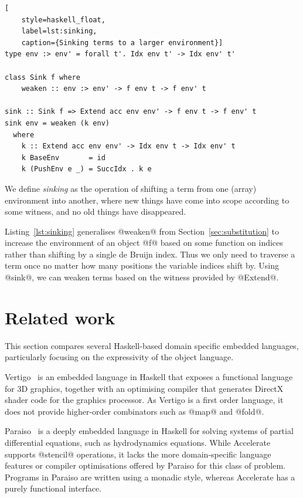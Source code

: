 \begin{lstlisting}[
    style=haskell_float,
    label=lst:sinking,
    caption={Sinking terms to a larger environment}]
type env :> env' = forall t'. Idx env t' -> Idx env' t'

class Sink f where
    weaken :: env :> env' -> f env t -> f env' t

sink :: Sink f => Extend acc env env' -> f env t -> f env' t
sink env = weaken (k env)
  where
    k :: Extend acc env env' -> Idx env t -> Idx env' t
    k BaseEnv       = id
    k (PushEnv e _) = SuccIdx . k e
\end{lstlisting}

We define \emph{sinking} as the operation of shifting a term from one (array)
environment into another, where new things have come into scope according to
some witness, and no old things have disappeared.

Listing~\ref{lst:sinking} generalises @weaken@ from
Section~\ref{sec:substitution} to increase the environment of an object @f@
based on some function on indices rather than shifting by a single de Bruijn
index. Thus we only need to traverse a term once no matter how many positions
the variable indices shift by. Using @sink@, we can weaken terms based on the
witness provided by @Extend@.


\section{Related work}

This section compares several Haskell-based domain specific embedded languages,
particularly focusing on the expressivity of the object language.
\lang[embedded]{}\lang[object]{}

Vertigo~\cite{Elliott:2004hh} is an embedded language in Haskell that exposes a
functional language for 3D graphics, together with an optimising compiler that
generates DirectX shader code for the graphics processor. As Vertigo is a first
order language, it does not provide higher-order combinators such as @map@ and
@fold@.

Paraiso~\cite{Muranushi:2012eh} is a deeply embedded language in Haskell for
solving systems of partial differential equations, such as hydrodynamics
equations. While Accelerate supports @stencil@ operations,
it lacks the more domain-specific language features or compiler optimisations
offered by Paraiso for this class of problem. Programs in Paraiso are written
using a monadic style, whereas Accelerate has a purely functional interface.

